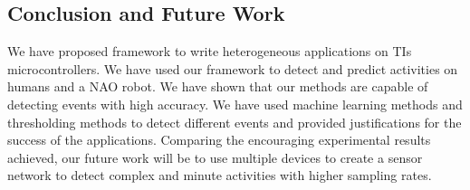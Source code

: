 \documentclass[letterpaper]{article}
\begin{document}
\begin{sloppy}
\section{Conclusion and Future Work}

We have proposed framework to write heterogeneous applications on TIs microcontrollers. We have used 
our framework to detect and predict activities on humans and a NAO robot. We 
have shown that our methods are capable of detecting events with high accuracy. We have used 
machine learning methods and thresholding methods to detect different events and provided 
justifications for the success of the applications. Comparing the encouraging experimental results 
achieved, our future work will be to use multiple devices to create a sensor network to detect 
complex and minute activities with higher sampling rates.  




\end{sloppy}
\end{document}

